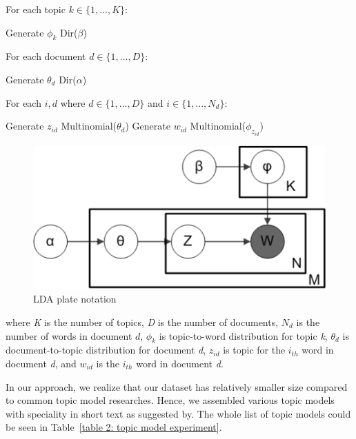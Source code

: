 \documentclass[10pt, conference, compsocconf]{IEEEtran}
\begin{document}
\begin{algorithmic}[1]
\STATE For each topic $k \in \{1,...,K\}$:
\begin{ALC@g} 
\STATE Generate $\phi_k$ \texttildelow{} Dir($\beta$) 
\end{ALC@g}
\STATE For each document $d \in \{1,...,D\}$:
\begin{ALC@g} 
\STATE Generate $\theta_d$ \texttildelow{} Dir($\alpha$) 
\end{ALC@g}
\STATE For each $i,d$ where $d \in \{1,...,D\}$ and $i \in \{1,...,N_d\}$:
\begin{ALC@g} 
\STATE Generate $z_{id}$ \texttildelow{} Multinomial($\theta_d$)
\STATE Generate $w_{id}$ \texttildelow{} Multinomial($\phi_{z_{id}}$)
\end{ALC@g}
\end{algorithmic}
\bigskip

\begin{figure}[b]
	\includegraphics[scale=0.5]{lda.png}
	\caption{LDA plate notation}
\label{fig_lda}
\end{figure}

\noindent where {\it K} is the number of topics, {\it D} is the number of documents, $N_d$ is the number of words in document $d$, $\phi_k$ is topic-to-word distribution for topic {\it k}, $\theta_d$ is document-to-topic distribution for document {\it d}, $z_{id}$ is topic for the $i_{th}$ word in document {\it d}, and $w_{id}$ is the $i_{th}$ word in document {\it d}.

In our approach, we realize that our dataset has relatively smaller size compared to common topic model researches. Hence, we assembled various topic models with speciality in short text as suggested by\cite{b6}. The whole list of topic models could be seen in Table~\ref{table 2: topic model experiment}.
\end{document}
